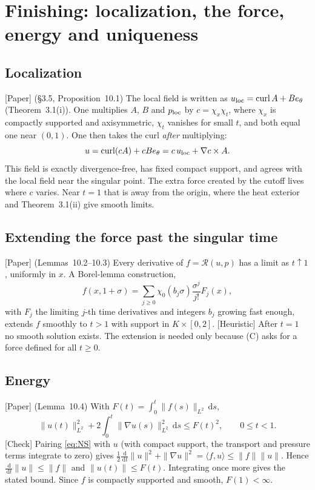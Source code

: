 \documentclass[11pt]{article}
\newcommand{\dd}{\,\mathrm{d}}
\newcommand{\Res}{\mathcal{R}}
\newcommand{\avg}[1]{\langle #1\rangle}
\DeclareMathOperator{\curl}{curl}
\theoremstyle{plain}
\theoremstyle{remark}
\newcommand{\paper}{\textsf{\small[Paper]}}
\newcommand{\chk}{\textsf{\small[Check]}}
\newcommand{\heur}{\textsf{\small[Heuristic]}}
\begin{document}
\section{Finishing: localization, the force, energy and uniqueness}\label{sec:finish}

\subsection{Localization}
\paper{} (\S3.5, Proposition~10.1) The local field is written as $u_{\rm loc}=\curl A+Be_\theta$ (Theorem~3.1(i)). One multiplies $A$, $B$ and $p_{\rm loc}$ by $c=\chi_x\chi_t$, where $\chi_x$ is compactly supported and axisymmetric, $\chi_t$ vanishes for small $t$, and both equal one near $(0,1)$. One then takes the curl \emph{after} multiplying:
\[
u=\curl(cA)+cBe_\theta=c\,u_{\rm loc}+\nabla c\times A .
\]
This field is exactly divergence-free, has fixed compact support, and agrees with the local field near the singular point. The extra force created by the cutoff lives where $c$ varies. Near $t=1$ that is away from the origin, where the heat exterior and Theorem~3.1(ii) give smooth limits.

\subsection{Extending the force past the singular time}
\paper{} (Lemmas~10.2--10.3) Every derivative of $f=\Res(u,p)$ has a limit as $t\uparrow1$, uniformly in $x$. A Borel-lemma construction,
\[
f(x,1+\sigma)=\sum_{j\ge0}\chi_0(b_j\sigma)\frac{\sigma^j}{j!}F_j(x),
\]
with $F_j$ the limiting $j$-th time derivatives and integers $b_j$ growing fast enough, extends $f$ smoothly to $t>1$ with support in $K\times[0,2]$. \heur{} After $t=1$ no smooth solution exists. The extension is needed only because (C) asks for a force defined for all $t\ge0$.

\subsection{Energy}\label{sec:energy}
\paper{} (Lemma~10.4) With $F(t)=\int_0^t\|f(s)\|_{L^2}\dd s$,
\[
\|u(t)\|_{L^2}^2+2\int_0^t\|\nabla u(s)\|_{L^2}^2\dd s\le F(t)^2,\qquad 0\le t<1 .
\]
\chk{} Pairing \eqref{eq:NS} with $u$ (with compact support, the transport and pressure terms integrate to zero) gives $\tfrac12\frac{\dd}{\dd t}\|u\|^2+\|\nabla u\|^2=\avg{f,u}\le\|f\|\|u\|$. Hence $\frac{\dd}{\dd t}\|u\|\le\|f\|$ and $\|u(t)\|\le F(t)$. Integrating once more gives the stated bound. Since $f$ is compactly supported and smooth, $F(1)<\infty$.
\end{document}
